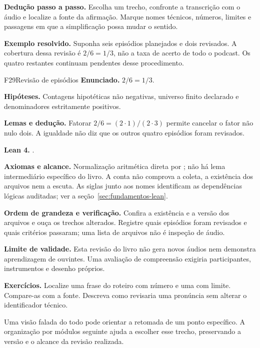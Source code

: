 \begin{metodo}
\textbf{Dedução passo a passo.} Escolha um trecho, confronte a transcrição com o áudio e localize a fonte da afirmação. Marque nomes técnicos, números, limites e passagens em que a simplificação possa mudar o sentido.
\end{metodo}

\begin{resultado}
\textbf{Exemplo resolvido.} Suponha seis episódios planejados e dois revisados. A cobertura dessa revisão é $2/6=1/3$, não a taxa de acerto de todo o podcast. Os quatro restantes continuam pendentes desse procedimento.
\end{resultado}
\begin{formalizacao}{F29}{Revisão de episódios}
\textbf{Enunciado.} $2/6=1/3$.

\textbf{Hipóteses.} Contagens hipotéticas não negativas, universo finito declarado e denominadores estritamente positivos.

\textbf{Lemas e dedução.} Fatorar $2/6=(2\cdot1)/(2\cdot3)$ permite cancelar o fator não nulo dois. A igualdade não diz que os outros quatro episódios foram revisados.

\textbf{Lean 4.} .

\textbf{Axiomas e alcance.} Normalização aritmética direta por ; não há lema intermediário específico do livro. A conta não comprova a coleta, a existência dos arquivos nem a escuta. As siglas junto aos nomes identificam as dependências lógicas auditadas; ver a seção~\ref{sec:fundamentos-lean}.
\end{formalizacao}


\begin{resultado}
\textbf{Ordem de grandeza e verificação.} Confira a existência e a versão dos arquivos e ouça os trechos alterados. Registre quais episódios foram revisados e quais critérios passaram; uma lista de arquivos não é inspeção de áudio.
\end{resultado}

\begin{aviso}
\textbf{Limite de validade.} Esta revisão do livro não gera novos áudios nem demonstra aprendizagem de ouvintes. Uma avaliação de compreensão exigiria participantes, instrumentos e desenho próprios.
\end{aviso}

\begin{resultado}
\textbf{Exercícios.} Localize uma frase do roteiro com número e uma com limite. Compare-as com a fonte. Descreva como revisaria uma pronúncia sem alterar o identificador técnico.
\end{resultado}

Uma visão falada do todo pode orientar a retomada de um ponto específico. A organização por módulos seguinte ajuda a escolher esse trecho, preservando a versão e o alcance da revisão realizada.
